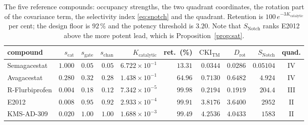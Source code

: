 \documentclass[11pt,reqno]{amsart}
\theoremstyle{plain}
\theoremstyle{definition}
\theoremstyle{remark}
\numberwithin{equation}{section}
\newcommand{\CKI}{\mathrm{CKI}}
\newcommand{\Kcat}{K_{\mathrm{catalytic}}}
\newcommand{\CKItm}{\CKI_{\mathrm{TM}}}
\newcommand{\Snotch}{S_{\mathrm{Notch}}}
\begin{document}
\begin{table}[ht]
\centering\footnotesize\setlength{\tabcolsep}{3.5pt}
\caption{The five reference compounds: occupancy strengths, the two quadrant coordinates, the rotation part of the covariance term, the selectivity index \eqref{eq:snotch} and the quadrant. Retention is $100\,e^{-3\Kcat}$ per cent; the design floor is $92\,\%$ and the potency threshold is $3.20$. Note that $\Snotch$ ranks E2012 above the more potent lead, which is Proposition~\ref{prop:sat}.}
\label{tab:compa}
\begin{tabular}{@{}l r r r r r r r r c@{}}
\toprule
compound & $s_{\mathrm{cat}}$ & $s_{\mathrm{gate}}$ & $s_{\mathrm{chan}}$ & $\Kcat$ & ret.\ (\%) & $\CKItm$ & $D_{\mathrm{rot}}$ & $\Snotch$ & quad. \\
\midrule
Semagacestat & $1.000$ & $0.05$ & $0.05$ & $6.722 \times 10^{-1}$ & $13.31$ & $0.0344$ & $0.0286$ & $0.05104$ & IV \\
Avagacestat & $0.280$ & $0.32$ & $0.28$ & $1.438 \times 10^{-1}$ & $64.96$ & $0.7130$ & $0.6482$ & $4.924$ & IV \\
R-Flurbiprofen & $0.004$ & $0.18$ & $0.12$ & $7.342 \times 10^{-5}$ & $99.98$ & $0.2194$ & $0.1919$ & $204.4$ & III \\
E2012 & $0.008$ & $0.95$ & $0.92$ & $2.933 \times 10^{-4}$ & $99.91$ & $3.8176$ & $3.6400$ & $2952$ & II \\
KMS-AD-309 & $0.020$ & $1.00$ & $1.00$ & $1.688 \times 10^{-3}$ & $99.49$ & $4.2536$ & $4.0433$ & $1583$ & II \\
\bottomrule
\end{tabular}
\end{table}
\end{document}
